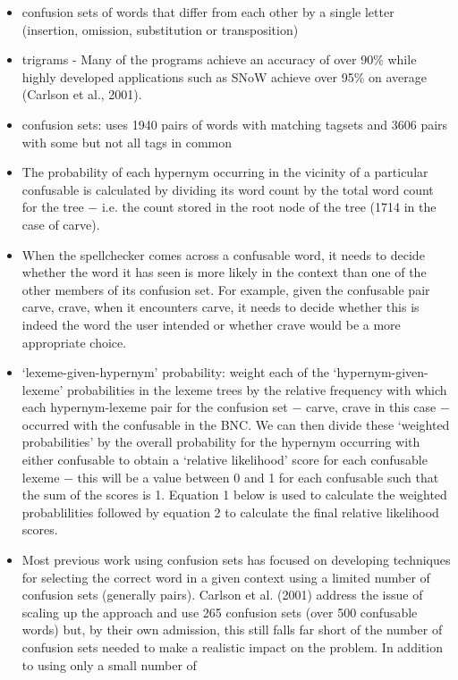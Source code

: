 \documentclass[a4paper,english,12pt]{article}
\begin{document}
\begin{spacing}{1.0}
\begin{itemize}
\item confusion sets of words that differ from each other by a single letter (insertion, omission, substitution or transposition) \cite{Pedler2007}
\item trigrams - Many of the programs achieve an accuracy of over 90\% while highly developed applications
such as SNoW achieve over 95\% on average (Carlson et al., 2001). \cite{Pedler2007}
\item confusion sets: \cite{Pedler2007} uses 1940 pairs of words with matching tagsets and 3606 pairs with some but not all tags in common
\item The probability of each hypernym occurring in the vicinity of a particular confusable is calculated by dividing its word count by the total word count for the tree − i.e. the count stored in the root node of the tree (1714 in the case of carve).
\item When the spellchecker comes across a confusable word, it needs to decide whether the word it has seen is more likely in the context than one of the other members of its confusion set. For example, given the confusable pair {carve, crave}, when it encounters carve, it needs to decide whether this is indeed the word the user intended or whether crave would be a more appropriate choice.
\item ‘lexeme-given-hypernym’ probability: weight each of the ‘hypernym-given-lexeme’ probabilities in the lexeme trees by the relative frequency with which each hypernym-lexeme pair for the confusion set − {carve, crave} in this case − occurred with the confusable in the BNC. We can then divide these ‘weighted probabilities’ by the overall probability for the hypernym occurring with either confusable to obtain a ‘relative likelihood’ score for each confusable lexeme − this will be a value between 0 and 1 for each confusable such that the sum of the scores is 1. Equation 1 below is used to calculate the weighted probablilities followed by equation 2 to calculate the final relative likelihood scores.
\item Most previous work using confusion sets has focused on developing techniques for selecting the
correct word in a given context using a limited number of confusion sets (generally pairs). Carlson
et al. (2001) address the issue of scaling up the approach and use 265 confusion sets (over 500
confusable words) but, by their own admission, this still falls far short of the number of confusion
sets needed to make a realistic impact on the problem. In addition to using only a small number of

\end{itemize}
\end{spacing}
\end{document}
